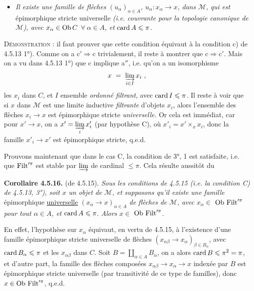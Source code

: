 \begin{itemize}
\item[\textit{c$'$)}] \textit{Il existe une famille de flèches $(u_{\alpha})_{\alpha\in A}$, $u_{\alpha} : x_{\alpha} \longrightarrow x$, dans $\mathcal{M}$, qui est} épimorphique stricte universelle \textit{(i.e. couvrante pour la topologie canonique de $\mathcal{M}$), avec $x_{\alpha} \in \mathrm{Ob}\, C$ $\forall\ \alpha \in A$, et} $\operatorname{card} A \leqslant \pi$.
\end{itemize}
\textsc{Démonstration} : il faut prouver que cette condition équivaut à la condition c) de 4.5.13 1°). Comme on a $\mathrm{c}' \Longrightarrow \mathrm{c}$ trivialement, il reste à montrer que $\mathrm{c} \Longrightarrow \mathrm{c}'$. Mais on a vu dans 4.5.13 1°) que c implique a$''$, i.e. qu'on a un isomorphisme
\[ x \ = \ \varinjlim_{i\in I} x_i \ , \]
les $x_i$ dans $C$, et $I$ ensemble \textit{ordonné filtrant}, avec $\operatorname{card} I \leqslant \pi$. Il reste à voir que si $x$ dans $\mathcal{M}$ est une limite inductive \textit{filtrante} d'objets $x_i$, alors l'ensemble des flèches $x_i \longrightarrow x$ est épimorphique stricte \textit{universelle.} Or cela est immédiat, car pour $x' \longrightarrow x$, on a $x' = \varinjlim\limits_{i} x'_i$ (par hypothèse C), où $x'_i = x' \times_x x_i$, donc la famille $x'_i \longrightarrow x'$ est épimorphique stricte, q.e.d.

Prouvons maintenant que dans le cas C, la condition de 3°, 1 est satisfaite, i.e. que $\operatorname{Filt}'^{\pi}$ est stable par $\varinjlim$ de cardinal $\leqslant \pi$. Cela
résulte aussitôt du

\textbf{Corollaire 4.5.16.} (de 4.5.15). \textit{Sous les conditions de 4.5.15 (i.e. la condition C) de 4.5.13, 3°), soit $x$ un objet de $\mathcal{M}$, et supposons qu'il existe une famille} épimorphique \underline{universelle} $(x_{\alpha} \longrightarrow x)_{\alpha\in A}$ \textit{de flèches de $\mathcal{M}$, avec $x_{\alpha} \in$} $\mathrm{Ob}\, \operatorname{Filt}'^{\pi}$ \textit{pour tout $\alpha \in A$, et} $\operatorname{card} A \leqslant \pi$. \textit{Alors $x \in$} $\mathrm{Ob}\, \operatorname{Filt}'^{\pi}$.

En effet, l'hypothèse sur $x_{\alpha}$ équivaut, en vertu de 4.5.15, à l'existence d'une famille épimorphique stricte universelle de flèches $(x_{\alpha\beta} \longrightarrow x_{\alpha})_{\beta\in B_{\alpha}}$, avec $\operatorname{card} B_{\alpha} \leqslant \pi$ et les $x_{\alpha\beta}$ dans $C$. Soit $B = \coprod_{\alpha\in A} B_{\alpha}$, on a alors $\operatorname{card} B \leqslant \pi^2 = \pi$, et d'autre part, la famille des flèches composées $x_{\alpha\beta} \longrightarrow x_{\alpha} \longrightarrow x$ indexée par $B$ est épimorphique stricte universelle (par transitivité de ce type de familles), donc $x \in \mathrm{Ob}\, \operatorname{Filt}'^{\pi}$, q.e.d.

